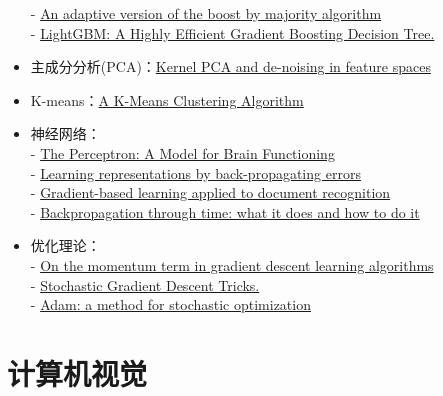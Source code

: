 \documentclass[lang=cn,11pt,a4paper]{eleganttemplate}
\begin{document}
\begin{itemize}
    - \href{https://cseweb.ucsd.edu/~yfreund/papers/brownboost.pdf}{An adaptive version of the boost by majority algorithm} \\
    - \href{https://papers.nips.cc/paper/2017/file/6449f44a102fde848669bdd9eb6b76fa-Paper.pdf}{LightGBM: A Highly Efficient Gradient Boosting Decision Tree.} 
    \item 主成分分析(PCA)：\href{https://alex.smola.org/papers/1999/MikSchSmoMuletal99.pdf}{Kernel PCA and de-noising in feature spaces}	
    \item K-means：\href{https://www.jstor.org/stable/2346830?seq=1}{A K-Means Clustering Algorithm}
    \item 神经网络：\\
    - \href{https://static1.squarespace.com/static/5b58c02775f9ee8fa7e52f00/t/5eff679acdfa560968e5f7f2/1593796507323/block_62.pdf}{The Perceptron: A Model for Brain Functioning}\\
    - \href{https://www.nature.com/articles/323533a0}{Learning representations by back-propagating errors}	\\
    - \href{http://vision.stanford.edu/cs598_spring07/papers/Lecun98.pdf}{Gradient-based learning applied to document recognition} \\
    - \href{https://ieeexplore.ieee.org/document/58337}{Backpropagation through time: what it does and how to do it} 
    \item 优化理论：\\
    - \href{https://citeseerx.ist.psu.edu/viewdoc/download?doi=10.1.1.57.5612&rep=rep1&type=pdf}{On the momentum term in gradient descent learning algorithms} \\
    - \href{https://www.microsoft.com/en-us/research/publication/stochastic-gradient-tricks/}{Stochastic Gradient Descent Tricks.}	\\
    - \href{https://arxiv.org/abs/1412.6980}{Adam: a method for stochastic optimization}
\end{itemize}

\section{计算机视觉}
\end{document}
